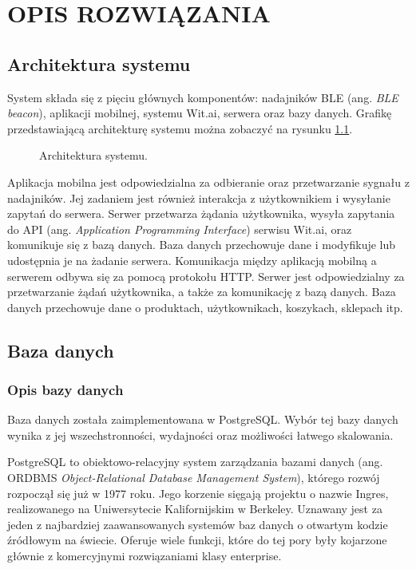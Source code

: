 \chapter{OPIS ROZWIĄZANIA}
\label{chapter:opis_rozwiazania}

\section{Architektura systemu}

System składa się z pięciu głównych komponentów: nadajników BLE (ang. \textit{BLE beacon}), aplikacji mobilnej, systemu Wit.ai, serwera oraz bazy danych. Grafikę przedstawiającą architekturę systemu można zobaczyć na rysunku \ref{fig:architecture}.

\begin{figure}[H]
    \centering
    
    \caption{Architektura systemu.}
    \label{fig:architecture}
\end{figure}

Aplikacja mobilna jest odpowiedzialna za odbieranie oraz przetwarzanie sygnału z nadajników. Jej zadaniem jest również interakcja z użytkownikiem i wysyłanie zapytań do serwera. Serwer przetwarza żądania użytkownika, wysyła zapytania do API (ang. \textit{Application Programming Interface}) serwisu Wit.ai, oraz komunikuje się z bazą danych. Baza danych przechowuje dane i modyfikuje lub udostępnia je na żadanie serwera. Komunikacja między aplikacją mobilną a serwerem odbywa się za pomocą protokołu HTTP. Serwer jest odpowiedzialny za przetwarzanie żądań użytkownika, a także za komunikację z bazą danych. Baza danych przechowuje dane o produktach, użytkownikach, koszykach, sklepach itp.

\section{Baza danych}

\subsection{Opis bazy danych}

Baza danych została zaimplementowana w PostgreSQL. Wybór tej bazy danych wynika z jej wszechstronności, wydajności oraz możliwości łatwego skalowania. 

PostgreSQL to obiektowo-relacyjny system zarządzania bazami danych (ang. ORDBMS \textit{Object-Relational Database Management System}), którego rozwój rozpoczął się już w 1977 roku. Jego korzenie sięgają projektu o nazwie Ingres, realizowanego na Uniwersytecie Kalifornijskim w Berkeley.
Uznawany jest za jeden z najbardziej zaawansowanych systemów baz danych o otwartym kodzie źródłowym na świecie. Oferuje wiele funkcji, które do tej pory były kojarzone głównie z komercyjnymi rozwiązaniami klasy enterprise. \cite{worsley2002practical}

